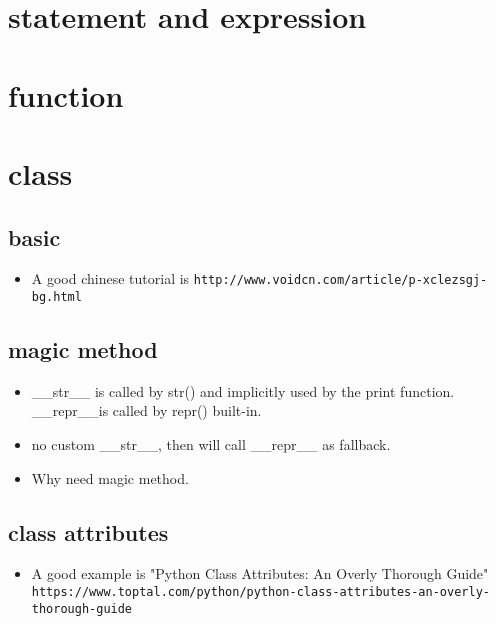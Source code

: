 \documentclass[a4paper,12pt,twoside]{book}
\begin{document}
\chapter{statement and expression}
\chapter{function}
\chapter{class}
\section{basic}
\begin{itemize}
	\item A good chinese tutorial is \verb!http://www.voidcn.com/article/p-xclezsgj-bg.html!
	
\end{itemize}
\section{magic method}
\begin{itemize}
	\item \_\_str\_\_ is called by str() and implicitly used by the print function. \_\_repr\_\_is called by repr() built-in. 
	\item no custom \_\_str\_\_, then will call \_\_repr\_\_ as fallback. 
	\item Why need magic method. 
\end{itemize}
\section{class attributes}
\begin{itemize}
	
	\item A good example is "Python Class Attributes: An Overly Thorough Guide" \verb!https://www.toptal.com/python/python-class-attributes-an-overly-thorough-guide!
\end{itemize}
\end{document}
